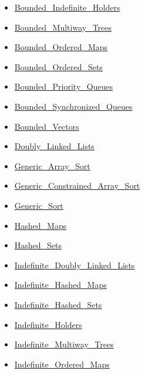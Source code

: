 \documentclass[english]{article}
\begin{document}
\begin{scriptsize}
\begin{multicols*}{5}
\begin{itemize}[leftmargin=0mm]
\begin{itemize}[leftmargin=5mm]
\begin{itemize}[leftmargin=5mm]
	\item[] \href{http://www.ada-auth.org/standards/22rm/html/RM-A-18-32.html}{Bounded\_Indefinite\_Holders}
	\item[] \href{http://www.ada-auth.org/standards/22rm/html/RM-A-18-25.html}{Bounded\_Multiway\_Trees}
	\item[] \href{http://www.ada-auth.org/standards/22rm/html/RM-A-18-22.html}{Bounded\_Ordered\_Maps}
	\item[] \href{http://www.ada-auth.org/standards/22rm/html/RM-A-18-24.html}{Bounded\_Ordered\_Sets}
	\item[] \href{http://www.ada-auth.org/standards/22rm/html/RM-A-18-31.html}{Bounded\_Priority\_Queues}
	\item[] \href{http://www.ada-auth.org/standards/22rm/html/RM-A-18-29.html}{Bounded\_Synchronized\_Queues}
	\item[] \href{http://www.ada-auth.org/standards/22rm/html/RM-A-18-19.html}{Bounded\_Vectors}
	\item[] \href{http://www.ada-auth.org/standards/22rm/html/RM-A-18-3.html}{Doubly\_Linked\_Lists}
	\item[] \href{http://www.ada-auth.org/standards/22rm/html/RM-A-18-26.html}{Generic\_Array\_Sort}
	\item[] \href{http://www.ada-auth.org/standards/22rm/html/RM-A-18-26.html}{Generic\_Constrained\_Array\_Sort}
	\item[] \href{http://www.ada-auth.org/standards/22rm/html/RM-A-18-26.html}{Generic\_Sort}
	\item[] \href{http://www.ada-auth.org/standards/22rm/html/RM-A-18-5.html}{Hashed\_Maps}
	\item[] \href{http://www.ada-auth.org/standards/22rm/html/RM-A-18-8.html}{Hashed\_Sets}
	\item[] \href{http://www.ada-auth.org/standards/22rm/html/RM-A-18-12.html}{Indefinite\_Doubly\_Linked\_Lists}
	\item[] \href{http://www.ada-auth.org/standards/22rm/html/RM-A-18-13.html}{Indefinite\_Hashed\_Maps}
	\item[] \href{http://www.ada-auth.org/standards/22rm/html/RM-A-18-15.html}{Indefinite\_Hashed\_Sets}
	\item[] \href{http://www.ada-auth.org/standards/22rm/html/RM-A-18-18.html}{Indefinite\_Holders}
	\item[] \href{http://www.ada-auth.org/standards/22rm/html/RM-A-18-17.html}{Indefinite\_Multiway\_Trees}
	\item[] \href{http://www.ada-auth.org/standards/22rm/html/RM-A-18-14.html}{Indefinite\_Ordered\_Maps}

\end{itemize}
\end{itemize}
\end{itemize}
\end{multicols*}
\end{scriptsize}
\end{document}
